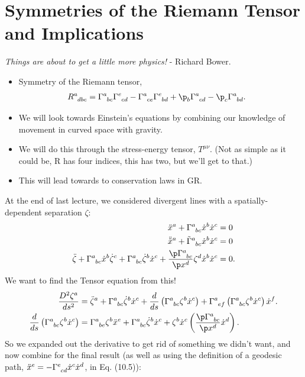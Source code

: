 \documentclass[a4paper, 11pt, normalem]{report}
\begin{document}
\chapter{Symmetries of the Riemann Tensor and Implications}
\emph{Things are about to get a little more physics!} - Richard Bower. 
\begin{itemize}
    \item Symmetry of the Riemann tensor,
        \begin{align}
            \tensor{R}{^a_{dbc}} &= \tensor{\Gamma}{^a_{bc}}\tensor{\Gamma}{^e_{cd}} - \tensor{\Gamma}{^a_{ce}}\tensor{\Gamma}{^e_{bd}} + \p_b\tensor{\Gamma}{^a_{cd}}-\p_c\tensor{\Gamma}{^a_{bd}}.
        \end{align}
    \item We will look towards Einstein's equations by combining our knowledge of movement in curved space with gravity.
    \item We will do this through the stress-energy tensor, $T^{\mu\nu}$. (Not as simple as it could be, R has four indices, this has two, but we'll get to that.)
    \item This will lead towards to conservation laws in GR.
\end{itemize}
At the end of last lecture, we considered divergent lines with a spatially-dependent separation $\zeta$:
\begin{align}
    \ddot{x}^a + \tensor{\Gamma}{^a_{bc}}\dot{x}^b\dot{x}^c &= 0 \\
    \ddot{\tilde{x}}^a + \tensor{\tilde{\Gamma}}{^a_{bc}}\dot{x}^b\dot{x}^c &= 0 \\
    \ddot{\zeta} + \tensor{\Gamma}{^a_{bc}}\dot{x}^b\dot{\zeta}^c + \tensor{\Gamma}{^a_{bc}}\dot{\zeta}^b\dot{x}^c + \frac{\p\tensor{\Gamma}{^a_{bc}}}{\p x^d}\zeta^d\dot{x}^b\dot{x}^c &= 0.
\end{align}
We want to find the Tensor equation from this!
\begin{align}
    \frac{D^2\zeta^a}{ds^2} &= \ddot{\zeta}^a + \tensor{\Gamma}{^a_{bc}}\dot{\zeta}^b\dot{x}^c + \frac{d}{ds}\left(\tensor{\Gamma}{^a_{bc}}\zeta^b\dot{x}^c\right) + \tensor{\Gamma}{^a_{ef}}\left(\tensor{\Gamma}{^a_{bc}}\zeta^b\dot{x}^c\right)\dot{x}^f.\\
    \frac{d}{ds}\left(\tensor{\Gamma}{^a_{bc}}\zeta^b\dot{x}^c\right) &= \tensor{\Gamma}{^a_{be}}\zeta^b\ddot{x}^e + \tensor{\Gamma}{^a_{bc}}\dot{\zeta}^b\dot{x}^c + \zeta^b\dot{x}^c\left(\frac{\p\tensor{\Gamma}{^a_{bc}}}{\p x^d}\dot{x}^d\right).
\end{align}
So we expanded out the derivative to get rid of something we didn't want, and now combine for the final result (as well as using the definition of a geodesic path, $\ddot{x}^e=-\tensor{\Gamma}{^e_{cd}}\dot{x}^c\dot{x}^d$, in Eq. (10.5)):
\end{document}
